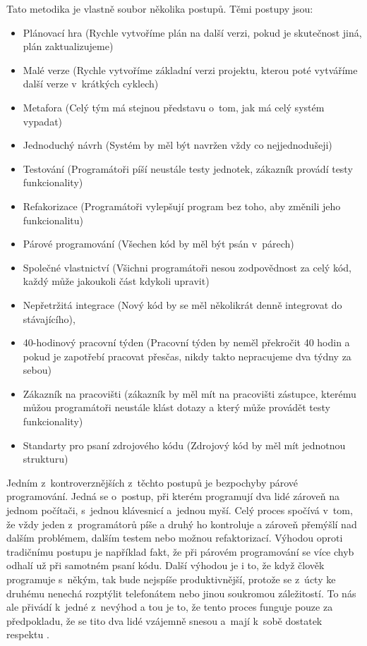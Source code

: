 \documentclass[12pt]{report}
\begin{document}
		Tato metodika je vlastně soubor několika postupů. Těmi postupy jsou:  
		\begin{itemize}
  \item Plánovací hra (Rychle vytvoříme plán na další verzi, pokud je skutečnost jiná, plán zaktualizujeme)
  \item Malé verze (Rychle vytvoříme základní verzi projektu, kterou poté vytváříme další verze v~krátkých cyklech)
  \item Metafora (Celý tým má stejnou představu o~tom, jak má celý systém vypadat)
  \item Jednoduchý návrh (Systém by měl být navržen vždy co nejjednodušeji)
  \item Testování (Programátoři píší neustále testy jednotek, zákazník provádí testy funkcionality)
  \item Refakorizace (Programátoři vylepšují program bez toho, aby změnili jeho funkcionalitu) 
  \item Párové programování (Všechen kód by měl být psán v~párech)
  \item Společné vlastnictví (Všichni programátoři nesou zodpovědnost za celý kód, každý může jakoukoli část kdykoli upravit)
  \item Nepřetržitá integrace (Nový kód by se měl několikrát denně integrovat do stávajícího), 
  \item 40-hodinový pracovní týden (Pracovní týden by neměl překročit 40 hodin a pokud je zapotřebí pracovat přesčas, nikdy takto nepracujeme dva týdny za sebou)
  \item Zákazník na pracovišti (zákazník by měl mít na pracovišti zástupce, kterému můžou programátoři neustále klást dotazy a který může provádět testy funkcionality)
  \item Standarty pro psaní zdrojového kódu (Zdrojový kód by měl mít jednotnou strukturu) \cite{Beck2002}
		\end{itemize}
		
		Jedním z~kontroverznějších z~těchto postupů je bezpochyby párové programování. Jedná se o~postup, při kterém programují dva lidé zároveň na jednom počítači, s~jednou klávesnicí a~jednou myší. Celý proces spočívá v~tom, že vždy jeden z~programátorů píše a druhý ho kontroluje a zároveň přemýšlí nad dalším problémem, dalším testem nebo možnou refaktorizací. Výhodou oproti tradičnímu postupu je například fakt, že při párovém programování se více chyb odhalí už při samotném psaní kódu. Další výhodou je i to, že když člověk programuje s~někým, tak bude nejspíše produktivnější, protože se z~úcty ke druhému nenechá rozptýlit telefonátem nebo jinou soukromou záležitostí. To nás ale přivádí k~jedné z~nevýhod a tou je to, že tento proces funguje pouze za předpokladu, že se tito dva lidé vzájemně snesou a~mají k~sobě dostatek respektu \cite{Beck2002}.\\
		
\end{document}
